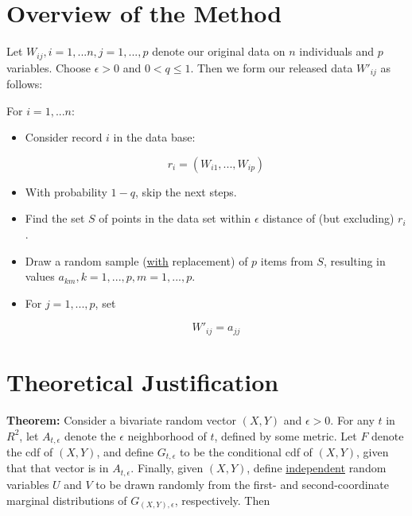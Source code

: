 \documentclass[11pt]{article}
\begin{document}
\section{Overview of the Method}
\label{overview}

Let $W_{ij}, i = 1,...n, j = 1,...,p$ denote our original data on $n$
individuals and $p$ variables.  Choose $\epsilon > 0$ and $0 < q \leq
1$.  Then we form our released data $W'_{ij}$ as follows:

For $i = 1,...n$:

\begin{itemize}

\item Consider record $i$ in the data base:

\begin{equation}
r_i = (W_{i1},...,W_{ip})
\end{equation}

\item With probability $1-q$, skip the next steps.

\item Find the set $S$ of points in the data set within $\epsilon$
distance of (but excluding) $r_i$.

\item Draw a random sample (\underline{with} replacement) of $p$ items
from $S$, resulting in values $a_{km}, k = 1,...,p, m = 1,...,p$.

\item For $j = 1,...,p$, set 

\begin{equation}
W'_{ij} = a_{jj}
\end{equation}

\end{itemize}

\section{Theoretical Justification}

{\bf Theorem:}  Consider a bivariate random vector $(X,Y)$ and $\epsilon >
0$.  For any $t$ in $R^2$, let $A_{t,\epsilon}$ denote the $\epsilon$
neighborhood of $t$, defined by some metric.  Let $F$ denote the
cdf of $(X,Y)$, and define $G_{t,\epsilon}$ to be the
conditional cdf of $(X,Y)$, given that that vector is in
$A_{t,\epsilon}$.  Finally, given $(X,Y)$, define \underline{independent}
random variables $U$ and $V$ to be drawn randomly from the first- and
second-coordinate marginal distributions of $G_{(X,Y),\epsilon}$,
respectively.  Then
\end{document}
